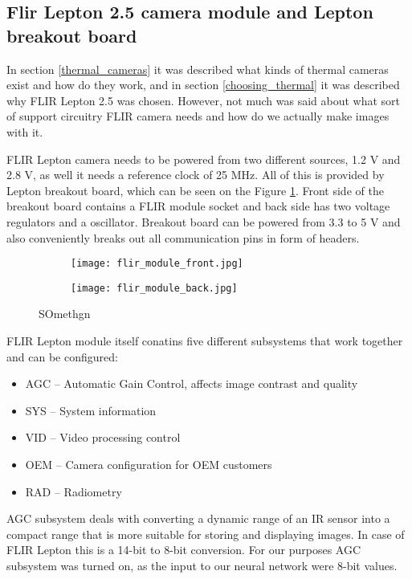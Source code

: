 \subsection{ Flir Lepton 2.5 camera module and Lepton breakout board}

In section \ref{thermal_cameras} it was described what kinds of thermal cameras exist and how do they work, and in section \ref{choosing_thermal} it was described why FLIR Lepton 2.5 was chosen.
However, not much was said about what sort of support circuitry FLIR camera needs and how do we actually make images with it.

FLIR Lepton camera needs to be powered from two different sources, 1.2 \si{\volt} and 2.8 \si{\volt}, as well it needs a reference clock of 25 \si{\mega\hertz}.
All of this is provided by Lepton breakout board, which can be seen on the Figure \ref{lepton_breakout}.
Front side of the breakout board contains a FLIR module socket and back side has two voltage regulators and a oscillator.
Breakout board can be powered from 3.3 to 5 \si{\volt} and also conveniently breaks out all communication pins in form of headers.

\begin{figure}[ht] 
    \begin{subfigure}[b]{0.5\textwidth}
        \centering
        \texttt{[image: flir\_module\_front.jpg]} 
    \end{subfigure}
    \begin{subfigure}[b]{0.5\textwidth}
        \centering
        \texttt{[image: flir\_module\_back.jpg]} 
    \end{subfigure}
    \caption{ SOmethgn}
    \label{lepton_breakout}
\end{figure}

FLIR Lepton module itself conatins five different subsystems that work together and can be configured:

\begin{itemize}
    \item AGC – Automatic Gain Control, affects image contrast and quality
    \item SYS – System information
    \item VID – Video processing control
    \item OEM – Camera configuration for OEM customers
    \item RAD – Radiometry
\end{itemize}

AGC subsystem deals with converting a dynamic range of an IR sensor into a compact range that is more suitable for storing and displaying images.
In case of FLIR Lepton this is a 14-bit to 8-bit conversion.
For our purposes AGC subsystem was turned on, as the input to our neural network were 8-bit values.

